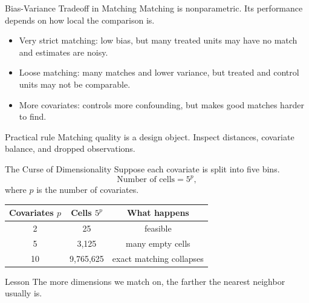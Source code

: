 \documentclass[11pt,aspectratio=169]{beamer}
\newcommand{\derivbutton}[1]{\vspace{0.4em}\hfill\hyperlink{app:#1}{\beamerbutton{Appendix details}}}
\begin{document}
\begin{frame}{Bias-Variance Tradeoff in Matching}
  \hypertarget{main:biasvariance}{}
  Matching is nonparametric. Its performance depends on how local the comparison is.
  \vspace{0.4em}

  \begin{itemize}
    \item Very strict matching:
      low bias, but many treated units may have no match and estimates are noisy.
    \item Loose matching:
      many matches and lower variance, but treated and control units may not be comparable.
    \item More covariates:
      controls more confounding, but makes good matches harder to find.
  \end{itemize}
  \begin{block}{Practical rule}
    Matching quality is a design object. Inspect distances, covariate balance, and dropped observations.
  \end{block}
  \derivbutton{matching-bias}
\end{frame}

\begin{frame}{The Curse of Dimensionality}
  Suppose each covariate is split into five bins.
  \[
    \text{Number of cells}=5^p,
  \]
  where \(p\) is the number of covariates.
  \vspace{0.4em}

  \begin{tabular}{ccc}
    \toprule
    Covariates \(p\) & Cells \(5^p\) & What happens \\
    \midrule
    2 & 25 & feasible \\
    5 & 3,125 & many empty cells \\
    10 & 9,765,625 & exact matching collapses \\
    \bottomrule
  \end{tabular}
  \vspace{0.5em}

  \begin{block}{Lesson}
    The more dimensions we match on, the farther the nearest neighbor usually is.
  \end{block}
\end{frame}
\end{document}
